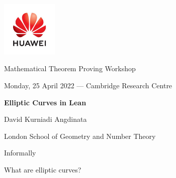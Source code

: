 \documentclass[10pt]{beamer}
\begin{document}
\begin{frame}

\begin{center}

\includegraphics[width=0.2\textwidth]{huawei.png}

{\large Mathematical Theorem Proving Workshop}

\vspace{0.5cm}

{\footnotesize Monday, 25 April 2022 --- Cambridge Research Centre}

\vspace{1cm}

\textbf{\Large Elliptic Curves in Lean}

\vspace{1cm}

David Kurniadi Angdinata

\vspace{0.5cm}

{\small London School of Geometry and Number Theory}

\end{center}

\end{frame}

\begin{frame}[t]{Informally}

What are elliptic curves?




\end{frame}
\end{document}
